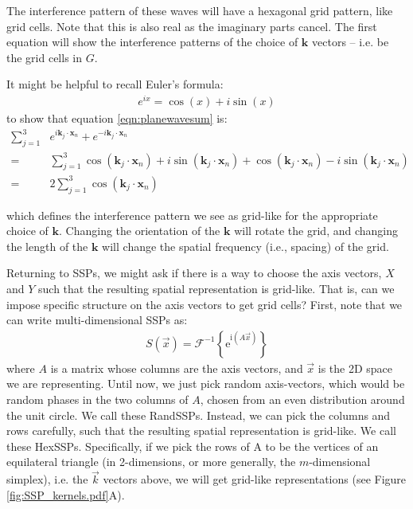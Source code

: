 \documentclass[10pt,letterpaper,oneside]{article}
\begin{document}
The interference pattern of these waves will have a hexagonal grid pattern, like grid cells. Note that this is also real as the imaginary parts cancel. The first equation will show the interference patterns of the choice of $\mathbf{k}$ vectors -- i.e. be the grid cells in $G$.

It might be helpful to recall Euler's formula: 
\begin{align}
   e^{i x} = \cos(x) + i \sin(x)
\end{align}
to show that equation \ref{eqn:planewavesum} is:
\begin{align}
  \sum_{j=1}^{3} & e^{i \mathbf{k}_j \cdot \mathbf{x}_n } + e^{-i \mathbf{k}_j \cdot \mathbf{x}_n } \\
  =&  \sum_{j=1}^{3} \cos(\mathbf{k}_j \cdot \mathbf{x}_n) + i \sin(\mathbf{k}_j \cdot \mathbf{x}_n) + \cos(\mathbf{k}_j \cdot \mathbf{x}_n) - i \sin(\mathbf{k}_j \cdot \mathbf{x}_n) \\
  =& 2 \sum_{j=1}^{3} \cos(\mathbf{k}_j \cdot \mathbf{x}_n)
\end{align}

which defines the interference pattern we see as grid-like for the appropriate choice of $\mathbf{k}$. Changing the orientation of the $\mathbf{k}$ will rotate the grid, and changing the length of the $\mathbf{k}$ will change the spatial frequency (i.e., spacing) of the grid.

Returning to SSPs, we might ask if there is a way to choose the axis vectors, $X$ and $Y$ such that the resulting spatial representation is grid-like. That is, can we impose specific structure on the axis vectors to get grid cells? First, note that we can write multi-dimensional SSPs as:
\begin{align}
S(\vec{x})=\mathcal{F}^{-1}\left\{\mathrm{e}^{\mathrm{i}(A \vec{x})}\right\}
\end{align}
where $A$ is a matrix whose columns are the axis vectors, and $\vec{x}$ is the 2D space we are representing. Until now, we just pick random axis-vectors, which would be random phases in the two columns of $A$, chosen from an even distribution around the unit circle. We call these RandSSPs. Instead, we can pick the columns and rows carefully, such that the resulting spatial representation is grid-like. We call these HexSSPs. Specifically, if we pick the rows of A to be the vertices of an equilateral triangle (in 2-dimensions, or more generally, the $m$-dimensional simplex), i.e. the $\vec{k}$ vectors above, we will get grid-like representations (see Figure \ref{fig:SSP_kernels.pdf}A). 
\end{document}
